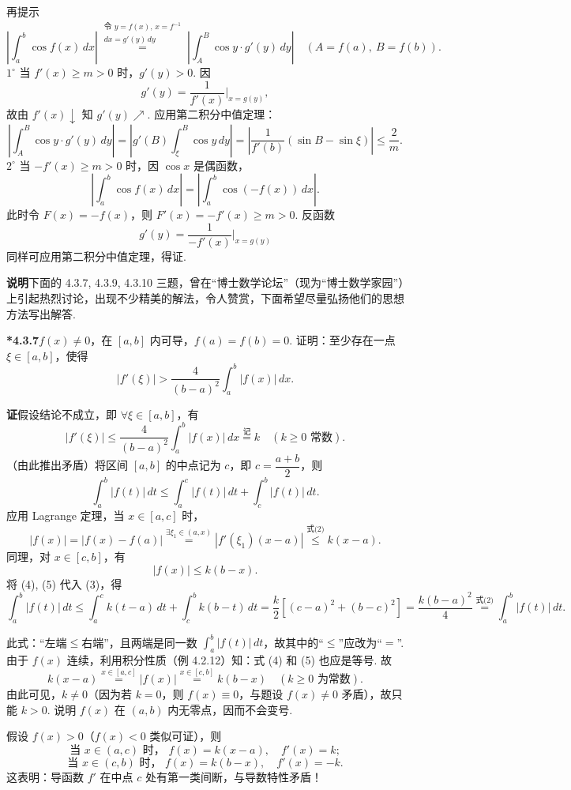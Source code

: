 \documentclass[UTF8,12pt,a4paper,fontset=fandol]{ctexart}
\begin{document}
再提示
\[
\left|\int_a^b\cos f(x)\,dx\right|
\stackrel{\substack{\text{令 }y=f(x),\,x=f^{-1}\\ dx=g'(y)\,dy}}{=}
\left|\int_A^B\cos y\cdot g'(y)\,dy\right|
\quad(A=f(a),\ B=f(b)).
\tag{1}
\]
$1^\circ$ 当 $f'(x)\ge m>0$ 时，$g'(y)>0$. 因
\[
g'(y)=\frac1{f'(x)}\bigg|_{x=g(y)},
\]
故由 $f'(x)\downarrow$ 知 $g'(y)\nearrow$. 应用第二积分中值定理：
\[
\left|\int_A^B\cos y\cdot g'(y)\,dy\right|
=\left|g'(B)\int_\xi^B\cos y\,dy\right|
=\left|\frac1{f'(b)}(\sin B-\sin\xi)\right|\le\frac2m.
\]
$2^\circ$ 当 $-f'(x)\ge m>0$ 时，因 $\cos x$ 是偶函数，
\[
\left|\int_a^b\cos f(x)\,dx\right|
=\left|\int_a^b\cos(-f(x))\,dx\right|.
\]
此时令 $F(x)=-f(x)$，则 $F'(x)=-f'(x)\ge m>0$. 反函数
\[
g'(y)=\frac1{-f'(x)}\bigg|_{x=g(y)}
\]
同样可应用第二积分中值定理，得证.

\noindent\textbf{说明}\quad 下面的 4.3.7, 4.3.9, 4.3.10 三题，曾在“博士数学论坛”（现为“博士数学家园”）上引起热烈讨论，出现不少精美的解法，令人赞赏，下面希望尽量弘扬他们的思想方法写出解答.

\noindent\textbf{*4.3.7}\quad $f(x)\ne0$，在 $[a,b]$ 内可导，$f(a)=f(b)=0$. 证明：至少存在一点 $\xi\in[a,b]$，使得
\[
|f'(\xi)|>\frac4{(b-a)^2}\int_a^b|f(x)|\,dx.
\tag{1}
\]

\noindent\textbf{证}\quad 假设结论不成立，即 $\forall\xi\in[a,b]$，有
\[
|f'(\xi)|\le\frac4{(b-a)^2}\int_a^b|f(x)|\,dx\stackrel{\text{记}}{=}k
\quad(k\ge0\text{ 常数}).
\tag{2}
\]
（由此推出矛盾）将区间 $[a,b]$ 的中点记为 $c$，即 $c=\dfrac{a+b}2$，则
\[
\int_a^b|f(t)|\,dt\le\int_a^c|f(t)|\,dt+\int_c^b|f(t)|\,dt.
\tag{3}
\]
应用 Lagrange 定理，当 $x\in[a,c]$ 时，
\[
|f(x)|=|f(x)-f(a)|
\stackrel{\exists\xi_1\in(a,x)}{=}|f'(\xi_1)(x-a)|
\stackrel{\text{式(2)}}{\le}k(x-a).
\tag{4}
\]
同理，对 $x\in[c,b]$，有
\[
|f(x)|\le k(b-x).
\tag{5}
\]
将 (4), (5) 代入 (3)，得
\[
\int_a^b|f(t)|\,dt
\le\int_a^c k(t-a)\,dt+\int_c^b k(b-t)\,dt
=\frac k2\left[(c-a)^2+(b-c)^2\right]
=\frac{k(b-a)^2}{4}
\stackrel{\text{式(2)}}{=}\int_a^b|f(t)|\,dt.
\tag{6}
\]

此式：“左端$\le$右端”，且两端是同一数 $\displaystyle\int_a^b|f(t)|\,dt$，故其中的“$\le$”应改为“$=$”. 由于 $f(x)$ 连续，利用积分性质（例 4.2.12）知：式 (4) 和 (5) 也应是等号. 故
\[
k(x-a)\stackrel{x\in[a,c]}{=}|f(x)|\stackrel{x\in[c,b]}{=}k(b-x)
\quad(k\ge0\text{ 为常数}).
\tag{7}
\]
由此可见，$k\ne0$（因为若 $k=0$，则 $f(x)\equiv0$，与题设 $f(x)\ne0$ 矛盾），故只能 $k>0$. 说明 $f(x)$ 在 $(a,b)$ 内无零点，因而不会变号.

假设 $f(x)>0$（$f(x)<0$ 类似可证），则
\[
\text{当 }x\in(a,c)\text{ 时， }f(x)=k(x-a),\quad f'(x)=k;
\]
\[
\text{当 }x\in(c,b)\text{ 时， }f(x)=k(b-x),\quad f'(x)=-k.
\]
这表明：导函数 $f'$ 在中点 $c$ 处有第一类间断，与导数特性矛盾！
\end{document}
